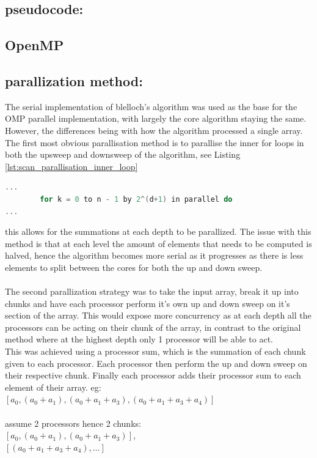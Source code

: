 \subsection*{pseudocode:} 
\subsection{OpenMP}
\subsection*{parallization method:}
The serial implementation of blelloch's algorithm was used as the base for the OMP parallel implementation, with largely the core algorithm staying the same. However, the differences being with how the algorithm processed a single array. The first most obvious parallisation method is to parallise the inner for loops in both the upsweep and downsweep of the algorithm, see Listing \ref{lst:scan_parallisation_inner_loop} 
\begin{lstlisting}[language=C, caption={parallisation of the inner loop}, label={lst:scan_parallisation_inner_loop}]
...
		for k = 0 to n - 1 by 2^(d+1) in parallel do
...
\end{lstlisting}
this allows for the summations at each depth to be parallized. The issue with this method is that at each level the amount of elements that needs to be computed is halved, hence the algorithm becomes more serial as it progresses as there is less elements to split between the cores for both the up and down sweep.\\\\ The second parallization strategy was to take the input array, break it up into chunks and have each processor perform it's own up and down sweep on it's section of the array. This would expose more concurrency as at each depth all the processors can be acting on their chunk of the array, in contrast to the original method where at the highest depth only 1 processor will be able to act.\\This was achieved using a processor sum, which is the summation of each chunk given to each processor. Each processor then perform the up and down sweep on their respective chunk. Finally each processor adds their processor sum to each element of their array. 
eg: $[a_0,(a_0+a_1),(a_0+a_1+a_3),(a_0+a_1+a_3+a_4)]$\\
\\ assume 2 processors hence 2 chunks:\\
$[a_0,(a_0+a_1),(a_0+a_1+a_3)]$,\\$[(a_0+a_1+a_3+a_4),\dots]$\\
